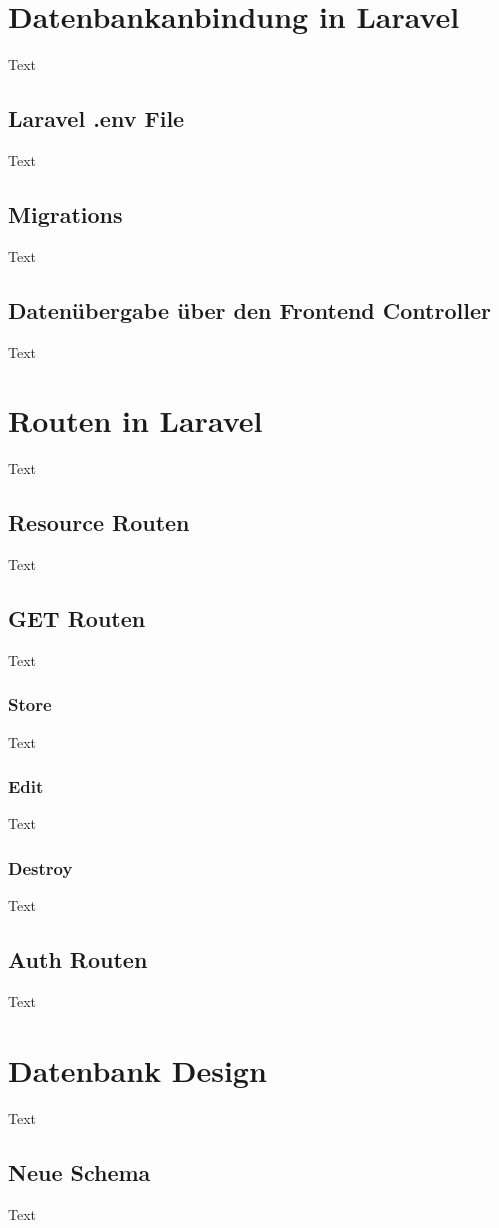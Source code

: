 \section{Datenbankanbindung in Laravel}
Text
\subsection{Laravel .env File}
Text
\subsection{Migrations}
Text
\subsection{Datenübergabe über den Frontend Controller}
Text

\section{Routen in Laravel}
Text
\subsection{Resource Routen}
Text
\subsection{GET Routen}
Text
\subsubsection{Store}
Text
\subsubsection{Edit}
Text
\subsubsection{Destroy}
Text

\subsection{Auth Routen}
Text

\section{Datenbank Design}
Text
\subsection{Neue Schema}
Text
